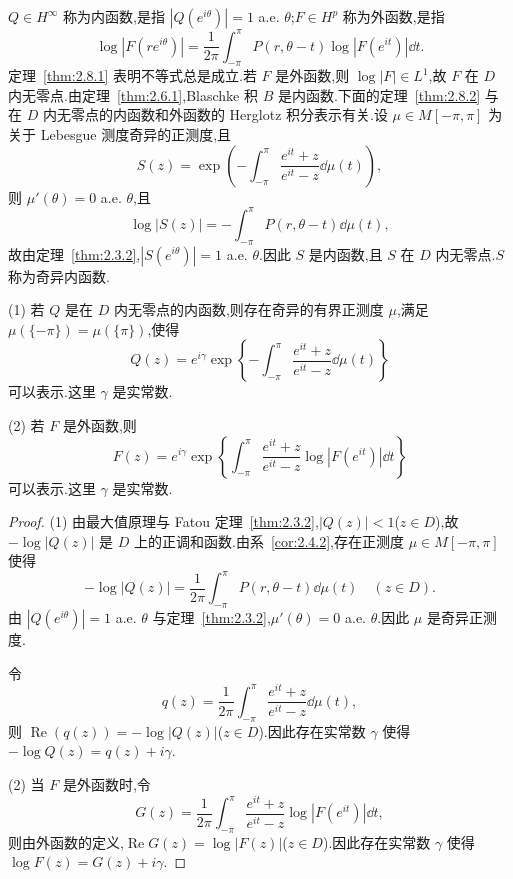 $Q \in H^{\infty}$ 称为内函数,是指 $|Q(e^{i\theta})| = 1$ a.e. $\theta$;$F \in H^{p}$ 称为外函数,是指
\begin{equation*}
\log|F(re^{i\theta})| = \frac{1}{2\pi}\int_{-\pi}^{\pi}P(r, \theta - t)\log|F(e^{it})|\dd t.
\end{equation*}
定理~\ref{thm:2.8.1} 表明不等式总是成立.若 $F$ 是外函数,则 $\log|F| \in L^{1}$,故 $F$ 在 $D$ 内无零点.由定理~\ref{thm:2.6.1},Blaschke 积 $B$ 是内函数.下面的定理~\ref{thm:2.8.2} 与在 $D$ 内无零点的内函数和外函数的 Herglotz 积分表示有关.设 $\mu \in M[-\pi, \pi]$ 为关于 Lebesgue 测度奇异的正测度,且
\begin{equation*}
S(z) = \exp\left(-\int_{-\pi}^{\pi}\frac{e^{it} + z}{e^{it} - z}\dd\mu(t)\right),
\end{equation*}
则 $\mu'(\theta) = 0$ a.e. $\theta$,且
\begin{equation*}
\log|S(z)| = -\int_{-\pi}^{\pi}P(r, \theta - t)\dd\mu(t),
\end{equation*}
故由定理~\ref{thm:2.3.2},$|S(e^{i\theta})| = 1$ a.e. $\theta$.因此 $S$ 是内函数,且 $S$ 在 $D$ 内无零点.$S$ 称为奇异内函数.

\begin{theorem}\label{thm:2.8.2}
(1) 若 $Q$ 是在 $D$ 内无零点的内函数,则存在奇异的有界正测度 $\mu$,满足 $\mu(\{-\pi\}) = \mu(\{\pi\})$,使得
\begin{equation*}
Q(z) = e^{i\gamma}\exp\left\{-\int_{-\pi}^{\pi}\frac{e^{it} + z}{e^{it} - z}\dd\mu(t)\right\}
\end{equation*}
可以表示.这里 $\gamma$ 是实常数.

(2) 若 $F$ 是外函数,则
\begin{equation*}
F(z) = e^{i\gamma}\exp\left\{\int_{-\pi}^{\pi}\frac{e^{it} + z}{e^{it} - z}\log|F(e^{it})|\dd t\right\}
\end{equation*}
可以表示.这里 $\gamma$ 是实常数.
\end{theorem}

\begin{proof}
(1) 由最大值原理与 Fatou 定理~\ref{thm:2.3.2},$|Q(z)| < 1$($z \in D$),故 $-\log|Q(z)|$ 是 $D$ 上的正调和函数.由系~\ref{cor:2.4.2},存在正测度 $\mu \in M[-\pi, \pi]$ 使得
\begin{equation*}
-\log|Q(z)| = \frac{1}{2\pi}\int_{-\pi}^{\pi}P(r, \theta - t)\dd\mu(t) \quad (z \in D).
\end{equation*}
由 $|Q(e^{i\theta})| = 1$ a.e. $\theta$ 与定理~\ref{thm:2.3.2},$\mu'(\theta) = 0$ a.e. $\theta$.因此 $\mu$ 是奇异正测度.

令
\begin{equation*}
q(z) = \frac{1}{2\pi}\int_{-\pi}^{\pi}\frac{e^{it} + z}{e^{it} - z}\dd\mu(t),
\end{equation*}
则 $\operatorname{Re}(q(z)) = -\log|Q(z)|$($z \in D$).因此存在实常数 $\gamma$ 使得 $-\log Q(z) = q(z) + i\gamma$.

(2) 当 $F$ 是外函数时,令
\begin{equation*}
G(z) = \frac{1}{2\pi}\int_{-\pi}^{\pi}\frac{e^{it} + z}{e^{it} - z}\log|F(e^{it})|\dd t,
\end{equation*}
则由外函数的定义,$\operatorname{Re}G(z) = \log|F(z)|$($z \in D$).因此存在实常数 $\gamma$ 使得 $\log F(z) = G(z) + i\gamma$.
\end{proof}

